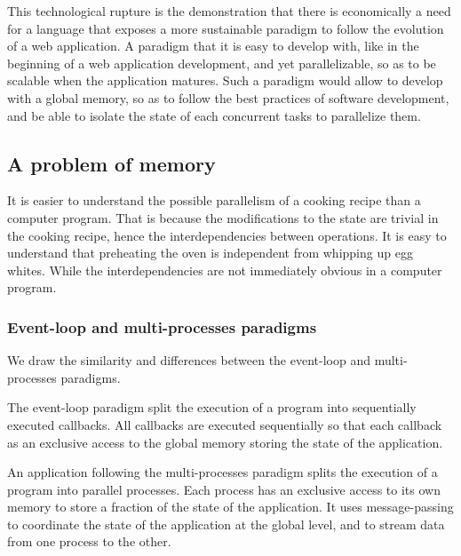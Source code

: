 

This technological rupture is the demonstration that there is economically a need for a language that exposes a more sustainable paradigm to follow the evolution of a web application.
A paradigm that it is easy to develop with, like in the beginning of a web application development, and yet parallelizable, so as to be scalable when the application matures.
Such a paradigm would allow to develop with a global memory, so as to follow the best practices of software development, and be able to isolate the state of each concurrent tasks to parallelize them.

\subsection{A problem of memory}

It is easier to understand the possible parallelism of a cooking recipe than a computer program.
That is because the modifications to the state are trivial in the cooking recipe, hence the interdependencies between operations.
It is easy to understand that preheating the oven is independent from whipping up egg whites.
While the interdependencies are not immediately obvious in a computer program.

\subsubsection{Event-loop and multi-processes paradigms}

We draw the similarity and differences between the event-loop and multi-processes paradigms.

The event-loop paradigm split the execution of a program into sequentially executed callbacks.
All callbacks are executed sequentially so that each callback as an exclusive access to the global memory storing the state of the application.

An application following the multi-processes paradigm splits the execution of a program into parallel processes.
Each process has an exclusive access to its own memory to store a fraction of the state of the application.
It uses message-passing to coordinate the state of the application at the global level, and to stream data from one process to the other.

